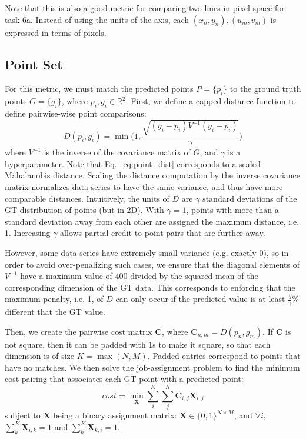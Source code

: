 \documentclass[a4paper,11pt]{scrartcl}
\begin{document}
Note that this is also a good metric for comparing two lines in pixel space for task 6a.
Instead of using the units of the axis, each $(x_n, y_n), (u_m, v_m)$ is expressed in terms of pixels.

\subsection{Point Set}

For this metric, we must match the predicted points $P = \{p_i\}$ to the ground truth points $G = \{g_i\}$, where $p_i, g_i \in \mathbb{R}^2$.
First, we define a capped distance function to define pairwise-wise point comparisons:
\begin{equation} \label{eq:point_dist}
D(p_i, g_i) = \min \Big(1, \frac{\sqrt{(g_i - p_i)V^{-1}(g_i - p_i)}}{\gamma} \Big)
\end{equation}
where $V^{-1}$ is the inverse of the covariance matrix of $G$, and $\gamma$ is a hyperparameter.
Note that Eq.~\ref{eq:point_dist} corresponds to a scaled Mahalanobis distance.
Scaling the distance computation by the inverse covariance matrix normalizes data series to have the same variance, and thus have more comparable distances.
Intuitively, the units of $D$ are $\gamma$ standard deviations of the GT distribution of points (but in 2D).
With $\gamma = 1$, points with more than a standard deviation away from each other are assigned the maximum distance, i.e. 1.
Increasing $\gamma$ allows partial credit to point pairs that are further away.

However, some data series have extremely small variance (e.g. exactly 0), so in order to avoid over-penalizing such cases, we ensure that the diagonal elements of $V^{-1}$ have a maximum value of 400 divided by the squared mean of the corresponding dimension of the GT data.
This corresponds to enforcing that the maximum penalty, i.e. 1, of $D$ can only occur if the predicted value is at least $\frac{5}{\gamma}\%$ different that the GT value.

Then, we create the pairwise cost matrix $\mathbf{C}$, where $\mathbf{C}_{n,m} = D(p_n,g_m)$.
If $\mathbf{C}$ is not square, then it can be padded with $1$s to make it square, so that each dimension is of size $K = \max(N,M)$.
Padded entries correspond to points that have no matches.
We then solve the job-assignment problem to find the minimum cost pairing that associates each GT point with a predicted point:
\begin{equation} \label{eq:assign}
cost = \min_{\mathbf{X}} \sum_i^K \sum_j^K \mathbf{C}_{i,j} \mathbf{X}_{i,j}
\end{equation}
subject to $\mathbf{X}$ being a binary assignment matrix: $\mathbf{X} \in \{0,1\}^{N \times M}$, and $\forall i$, $\sum_k^K \mathbf{X}_{i,k} = 1$ and $\sum_k^K \mathbf{X}_{k,i} = 1$.
\end{document}
